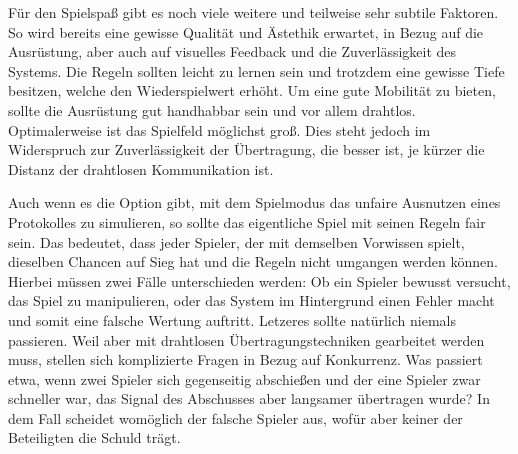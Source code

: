 Für den Spielspaß gibt es noch viele weitere und teilweise sehr subtile
Faktoren. So wird bereits eine gewisse Qualität und Ästethik erwartet, in
Bezug auf die Ausrüstung, aber auch auf visuelles Feedback und die
Zuverlässigkeit des Systems. Die Regeln sollten leicht zu lernen sein und
trotzdem eine gewisse Tiefe besitzen, welche den Wiederspielwert erhöht.
Um eine gute Mobilität zu bieten, sollte die Ausrüstung gut handhabbar sein
und vor allem drahtlos. Optimalerweise ist das Spielfeld möglichst groß. Dies
steht jedoch im Widerspruch zur Zuverlässigkeit der Übertragung, die besser ist,
je kürzer die Distanz der drahtlosen Kommunikation ist.

Auch wenn es die Option gibt, mit dem Spielmodus das unfaire Ausnutzen eines
Protokolles zu simulieren, so sollte das eigentliche Spiel mit seinen Regeln
fair sein. Das bedeutet, dass jeder Spieler, der mit demselben Vorwissen spielt,
dieselben Chancen auf Sieg hat und die Regeln nicht umgangen werden können.
Hierbei müssen zwei Fälle unterschieden werden: Ob ein Spieler bewusst versucht,
das Spiel zu manipulieren, oder das System im Hintergrund einen Fehler macht
und somit eine falsche Wertung auftritt. Letzeres sollte natürlich niemals
passieren. Weil aber mit drahtlosen Übertragungstechniken gearbeitet werden
muss, stellen sich komplizierte Fragen in Bezug auf Konkurrenz. Was passiert
etwa, wenn zwei Spieler sich gegenseitig abschießen und der eine Spieler
zwar schneller war, das Signal des Abschusses aber langsamer übertragen wurde?
In dem Fall scheidet womöglich der falsche Spieler aus, wofür aber keiner der
Beteiligten die Schuld trägt.
